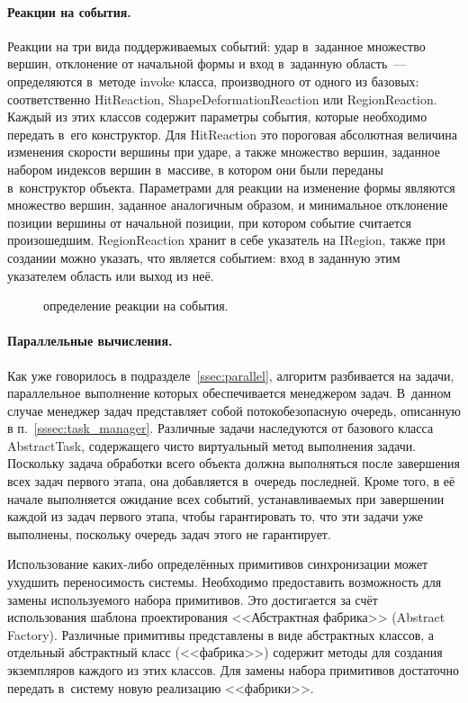 \documentclass[a4paper, 14pt, titlepage]{extarticle}
\newcommand{\eng}[1]{{\English #1}}
\newcommand{\includefigure}[3][]{
    \begin{figure}[!htb]
      \center{\texttt{[image: \#2]}}
      \caption{#3} \label{fig:#2}
    \end{figure}
  }
\begin{document}
        \paragraph{Реакции на события.}
        Реакции на три вида поддерживаемых событий: удар в~заданное множество вершин, отклонение от
        начальной формы и вход в~заданную область~--- определяются в~методе invoke класса,
        производного от одного из базовых: соответственно HitReaction, ShapeDeformationReaction или RegionReaction.
        Каждый из этих классов содержит параметры события, которые
        необходимо передать в~его конструктор. Для HitReaction это пороговая абсолютная величина
        изменения скорости вершины при ударе, а также множество вершин, заданное набором индексов вершин
        в~массиве, в котором они были переданы в~конструктор объекта. Параметрами для
        реакции на изменение формы являются множество вершин, заданное аналогичным образом, и минимальное
        отклонение позиции вершины от начальной позиции, при котором событие считается произошедшим.
        RegionReaction хранит в себе указатель на IRegion, также при создании можно указать, что
        является событием: вход в заданную этим указателем область или выход из неё.

        \includefigure{core-reactions}{определение реакции на события.}

        \paragraph{Параллельные вычисления.}
        Как уже говорилось в подразделе~\ref{ssec:parallel}, алгоритм разбивается на задачи, параллельное
        выполнение которых обеспечивается менеджером задач. В~данном случае менеджер задач представляет собой
        потокобезопасную очередь, описанную в п.~\ref{sssec:task_manager}. Различные задачи
        наследуются от базового класса AbstractTask, содержащего чисто виртуальный метод выполнения
        задачи.  Поскольку задача обработки всего объекта должна выполняться после завершения всех
        задач первого этапа, она добавляется в~очередь последней. Кроме того, в её начале
        выполняется ожидание всех событий, устанавливаемых при завершении каждой из задач первого
        этапа, чтобы гарантировать то, что эти задачи уже выполнены, поскольку очередь задач этого не гарантирует.

        Использование каких-либо определённых примитивов синхронизации может ухудшить переносимость
        системы. Необходимо предоставить возможность для замены используемого набора примитивов.
        Это достигается за счёт использования шаблона проектирования <<Абстрактная фабрика>> (\eng{Abstract
        Factory}). Различные примитивы представлены в виде абстрактных классов, а отдельный
        абстрактный класс (<<фабрика>>) содержит методы для создания экземпляров каждого из этих
        классов. Для замены набора примитивов достаточно передать в~систему новую реализацию
        <<фабрики>>.
\end{document}
